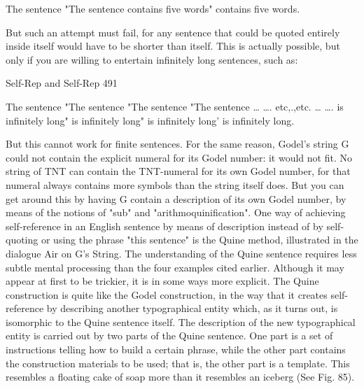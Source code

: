 {The sentence "The sentence contains five words" contains five words.

But such an attempt must fail, for any sentence that could be quoted entirely inside itself
would have to be shorter than itself. This is actually possible, but only if you are willing to
entertain infinitely long sentences, such as:



Self-Rep and Self-Rep                                                                         491

The sentence
       "The sentence
              "The sentence
                     "The sentence
                            …
                                            ….
                                                                etc,.,etc.
                                            …
                                     ….
                      is infinitely long"
             is infinitely long"
         is infinitely long'
is infinitely long.

But this cannot work for finite sentences. For the same reason, Godel's string G could not
contain the explicit numeral for its Godel number: it would not fit. No string of TNT can
contain the TNT-numeral for its own Godel number, for that numeral always contains more
symbols than the string itself does. But you can get around this by having G contain a
description of its own Godel number, by means of the notions of "sub" and
"arithmoquinification".
         One way of achieving self-reference in an English sentence by means of description
instead of by self-quoting or using the phrase "this sentence" is the Quine method, illustrated
in the dialogue Air on G's String. The understanding of the Quine sentence requires less
subtle mental processing than the four examples cited earlier. Although it may appear at first
to be trickier, it is in some ways more explicit. The Quine construction is quite like the Godel
construction, in the way that it creates self-reference by describing another typographical
entity which, as it turns out, is isomorphic to the Quine sentence itself. The description of the
new typographical entity is carried out by two parts of the Quine sentence. One part is a set
of instructions telling how to build a certain phrase, while the other part contains the
construction materials to be used; that is, the other part is a template. This resembles a
floating cake of soap more than it resembles an iceberg (See Fig. 85).




}
